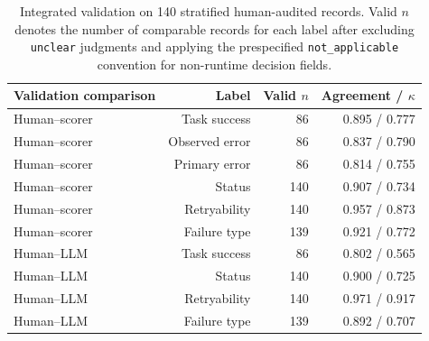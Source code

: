 \begin{table}[htbp]
\centering
\small
\begin{tabular}{lrrr}
\toprule
Validation comparison & Label & Valid $n$ & Agreement / $\kappa$ \\
\midrule
Human--scorer & Task success & 86 & 0.895 / 0.777 \\
Human--scorer & Observed error & 86 & 0.837 / 0.790 \\
Human--scorer & Primary error & 86 & 0.814 / 0.755 \\
Human--scorer & Status & 140 & 0.907 / 0.734 \\
Human--scorer & Retryability & 140 & 0.957 / 0.873 \\
Human--scorer & Failure type & 139 & 0.921 / 0.772 \\
\midrule
Human--LLM & Task success & 86 & 0.802 / 0.565 \\
Human--LLM & Status & 140 & 0.900 / 0.725 \\
Human--LLM & Retryability & 140 & 0.971 / 0.917 \\
Human--LLM & Failure type & 139 & 0.892 / 0.707 \\
\bottomrule
\end{tabular}
\caption{Integrated validation on 140 stratified human-audited records. Valid $n$ denotes the number of comparable records for each label after excluding \texttt{unclear} judgments and applying the prespecified \texttt{not\_applicable} convention for non-runtime decision fields.}
\label{tab:integrated-validation}
\end{table}
